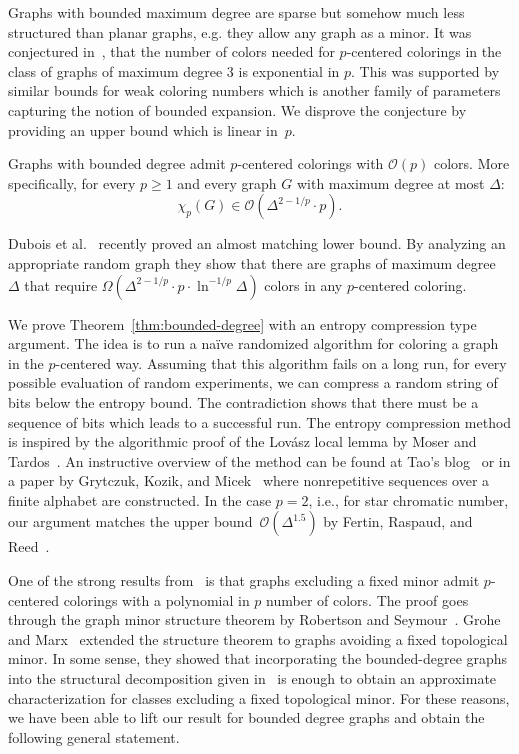Graphs with bounded maximum degree are sparse but somehow 
much less structured than planar graphs, e.g. 
they allow any graph as a minor.
It was conjectured in~\cite{PS19}, that the number of colors
needed for $p$-centered colorings in the class of graphs of maximum degree $3$ 
is exponential in $p$.
This was supported by similar bounds for weak coloring numbers 
which is another family of parameters capturing the notion 
of bounded expansion. We disprove the conjecture by providing an upper
bound which is linear in~$p$.
\begin{theorem}\label{thm:bounded-degree}
Graphs with bounded degree admit $p$-centered colorings with $\mathcal{O}(p)$ colors.
More specifically, for every $p\geq1$ 
and every graph $G$ with maximum degree at most $\Delta$:
\[
\chi_p(G)\in \mathcal{O}\left(\Delta^{2-1/p} \cdot p\right).
\]
\end{theorem}

Dubois et al.~\cite{DJPPP20} recently proved an
almost matching lower bound. By analyzing an appropriate random graph
they show that there are graphs of maximum degree $\Delta$ that
require $\Omega(\Delta^{2-1/p}\cdot p\cdot \ln^{-1/p}\Delta)$ colors in any
$p$-centered coloring.

We prove Theorem~\ref{thm:bounded-degree} with an entropy compression type
argument.  The idea is to run a naïve randomized algorithm for coloring a
graph in the $p$-centered way.  Assuming that this algorithm fails on a long
run, for every possible evaluation of random experiments, we can compress a
random string of bits below the entropy bound. The contradiction shows that
there must be a sequence of bits which leads to a successful run.  The entropy
compression method is inspired by the algorithmic proof of the Lovász local
lemma by Moser and Tardos~\cite{MT10}.  An instructive overview of the method
can be found at Tao's blog~\cite{Tao09} or in a paper by Grytczuk, Kozik, and
Micek~\cite{GKM13} where nonrepetitive sequences over a finite alphabet are
constructed.  In the case $p=2$, i.e., for star chromatic number, our argument
matches the upper bound~$\mathcal{O}(\Delta^{1.5})$ by Fertin, Raspaud, and
Reed~\cite{FRR04}.

One of the strong results from~\cite{PS19} is that graphs excluding a fixed minor 
admit $p$-centered colorings with a polynomial in $p$ number of colors. 
The proof goes through the graph minor structure theorem by Robertson and Seymour~\cite{RS03}.
Grohe and Marx~\cite{GM15} extended the structure theorem to graphs avoiding a fixed topological minor.
In some sense, they showed that incorporating the bounded-degree graphs into the structural decomposition 
given in~\cite{RS03} is enough to obtain an approximate characterization for 
classes excluding a fixed topological minor.
For these reasons, we have been able to lift our result for bounded degree graphs and 
obtain the following general statement.

